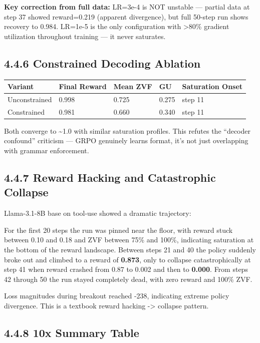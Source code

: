 \documentclass[
  american,
  11pt,
  a4paper,
  oneside]{report}
\newcounter{none} %
\begin{document}
\textbf{Key correction from full data:} LR=3e-4 is NOT unstable ---
partial data at step 37 showed reward=0.219 (apparent divergence), but
full 50-step run shows recovery to 0.984. LR=1e-5 is the only
configuration with \textgreater80\% gradient utilization throughout
training --- it never saturates.

\subsection{4.4.6 Constrained Decoding
Ablation}\label{constrained-decoding-ablation}

{\def\LTcaptype{none} %
\begin{longtable}[]{@{}lllll@{}}
\toprule\noalign{}
Variant & Final Reward & Mean ZVF & GU & Saturation Onset \\
\midrule\noalign{}
\endhead
\bottomrule\noalign{}
\endlastfoot
Unconstrained & 0.998 & 0.725 & 0.275 & step 11 \\
Constrained & 0.981 & 0.660 & 0.340 & step 11 \\
\end{longtable}
}

Both converge to \textasciitilde1.0 with similar saturation profiles.
This refutes the ``decoder confound'' criticism --- GRPO genuinely
learns format, it's not just overlapping with grammar enforcement.

\subsection{4.4.7 Reward Hacking and Catastrophic
Collapse}\label{reward-hacking-and-catastrophic-collapse}

Llama-3.1-8B base on tool-use showed a dramatic trajectory:

For the first 20 steps the run was pinned near the floor, with reward
stuck between 0.10 and 0.18 and ZVF between 75\% and 100\%, indicating
saturation at the bottom of the reward landscape. Between steps 21 and
40 the policy suddenly broke out and climbed to a reward of
\textbf{0.873}, only to collapse catastrophically at step 41 when reward
crashed from 0.87 to 0.002 and then to \textbf{0.000}. From steps 42
through 50 the run stayed completely dead, with zero reward and 100\%
ZVF.

Loss magnitudes during breakout reached -238, indicating extreme policy
divergence. This is a textbook reward hacking -\textgreater{} collapse
pattern.

\subsection{4.4.8 10x Summary Table}\label{x-summary-table}
\end{document}
